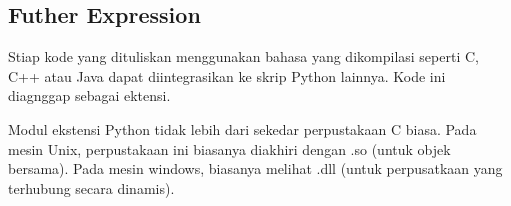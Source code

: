 \documentclass{wileySix}
\begin{document}
\begin{myEnumerate}
{\begin{myEnumerate}
\chapter{Futher Expression}
\par
\vspace{14pt}
\noindent 
\hspace*{0.5in} Stiap kode yang dituliskan menggunakan bahasa yang dikompilasi seperti C, C++ atau Java dapat diintegrasikan ke skrip Python lainnya. Kode ini diagnggap sebagai ektensi. \par
\noindent 
\hspace*{0.5in} Modul ekstensi Python tidak lebih dari sekedar perpustakaan C biasa. Pada mesin Unix, perpustakaan ini biasanya diakhiri dengan .so (untuk objek bersama). Pada mesin windows, biasanya melihat .dll (untuk perpusatkaan yang terhubung secara dinamis).  \par
\vspace{12pt}
\noindent 


\end{myEnumerate}}
\end{myEnumerate}
\end{document}
